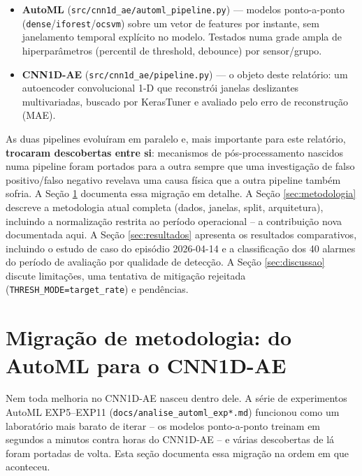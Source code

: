 \documentclass[11pt,a4paper]{article}
\begin{document}
\begin{itemize}[leftmargin=1.4em]
  \item \textbf{AutoML} (\texttt{src/cnn1d\_ae/automl\_pipeline.py}) ---
    modelos ponto-a-ponto (\texttt{dense}/\texttt{iforest}/\texttt{ocsvm})
    sobre um vetor de features por instante, sem janelamento temporal
    explícito no modelo. Testados numa grade ampla de hiperparâmetros
    (percentil de threshold, debounce) por sensor/grupo.
  \item \textbf{CNN1D-AE} (\texttt{src/cnn1d\_ae/pipeline.py}) --- o
    objeto deste relatório: um autoencoder convolucional 1-D que
    reconstrói janelas deslizantes multivariadas, buscado por
    KerasTuner e avaliado pelo erro de reconstrução (MAE).
\end{itemize}

As duas pipelines evoluíram em paralelo e, mais importante para este
relatório, \textbf{trocaram descobertas entre si}: mecanismos de
pós-processamento nascidos numa pipeline foram portados para a outra
sempre que uma investigação de falso positivo/falso negativo revelava
uma causa física que a outra pipeline também sofria. A Seção
\ref{sec:migracao} documenta essa migração em detalhe. A Seção
\ref{sec:metodologia} descreve a metodologia atual completa (dados,
janelas, split, arquitetura), incluindo a normalização restrita ao
período operacional -- a contribuição nova documentada aqui. A Seção
\ref{sec:resultados} apresenta os resultados comparativos, incluindo o
estudo de caso do episódio 2026-04-14 e a classificação dos 40 alarmes
do período de avaliação por qualidade de detecção. A Seção
\ref{sec:discussao} discute limitações, uma tentativa de mitigação
rejeitada (\texttt{THRESH\_MODE=target\_rate}) e pendências.

\section{Migração de metodologia: do AutoML para o CNN1D-AE}
\label{sec:migracao}

Nem toda melhoria no CNN1D-AE nasceu dentro dele. A série de
experimentos AutoML EXP5--EXP11 (\texttt{docs/analise\_automl\_exp*.md})
funcionou como um laboratório mais barato de iterar -- os modelos
ponto-a-ponto treinam em segundos a minutos contra horas do CNN1D-AE
-- e várias descobertas de lá foram portadas de volta. Esta seção
documenta essa migração na ordem em que aconteceu.
\end{document}

